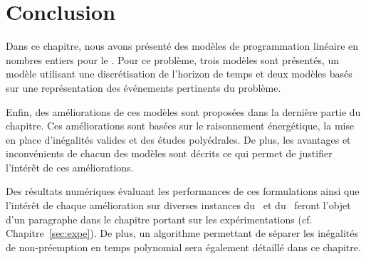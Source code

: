 \section*{Conclusion}

Dans ce chapitre, nous avons présenté des modèles de programmation
linéaire en nombres entiers pour le \CECSP. Pour ce problème, trois
modèles sont présentés,  
un modèle utilisant une discrétisation de l'horizon de temps et deux
modèles basés sur une représentation des événements pertinents du
problème. 

Enfin, des améliorations de ces modèles sont proposées dans la
dernière partie du chapitre. Ces améliorations sont basées sur le
raisonnement énergétique, la mise en place d'inégalités valides et des
études polyédrales. De plus, les avantages et inconvénients de chacun
des modèles sont décrits ce qui permet de justifier l'intérêt de ces
améliorations. 

Des résultats numériques évaluant les performances de ces formulations
ainsi que l'intérêt de chaque amélioration sur diverses instances du
\CECSP~et du \RCPSP~feront l'objet d'un paragraphe dans le chapitre
portant sur les expérimentations (cf. Chapitre~\ref{sec:expe}). De
plus, un algorithme permettant de séparer les inégalités de
non-préemption en temps polynomial sera également détaillé dans ce
chapitre. 
